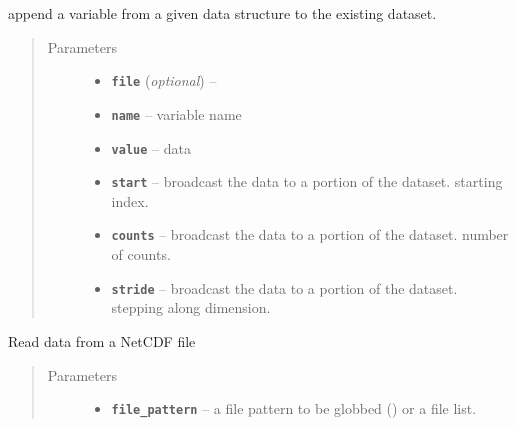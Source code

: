 \documentclass[letterpaper,10pt,english]{sphinxmanual}
\begin{document}
\begin{fulllineitems}
\begin{fulllineitems}
\label{altimetry.tools.nctools:altimetry.tools.nctools.nc.push}
append a variable from a given data structure to the existing dataset.
\begin{quote}\begin{description}
\item[{Parameters}] \leavevmode\begin{itemize}
\item {} 
\textbf{\texttt{file}} (\emph{optional}) -- 

\item {} 
\textbf{\texttt{name}} -- variable name

\item {} 
\textbf{\texttt{value}} -- data

\item {} 
\textbf{\texttt{start}} -- broadcast the data to a portion of the dataset. starting index.

\item {} 
\textbf{\texttt{counts}} -- broadcast the data to a portion of the dataset. number of counts.

\item {} 
\textbf{\texttt{stride}} -- broadcast the data to a portion of the dataset. stepping along dimension.

\end{itemize}

\end{description}\end{quote}

\end{fulllineitems}


\begin{fulllineitems}
\label{altimetry.tools.nctools:altimetry.tools.nctools.nc.read}
Read data from a NetCDF file
\begin{quote}\begin{description}
\item[{Parameters}] \leavevmode\begin{itemize}
\item {} 
\textbf{\texttt{file\_pattern}} -- a file pattern to be globbed (\href{http://docs.python.org/library/glob.html\#glob.glob}{}) or a file list.


\end{itemize}
\end{description}
\end{quote}
\end{fulllineitems}
\end{fulllineitems}
\end{document}
